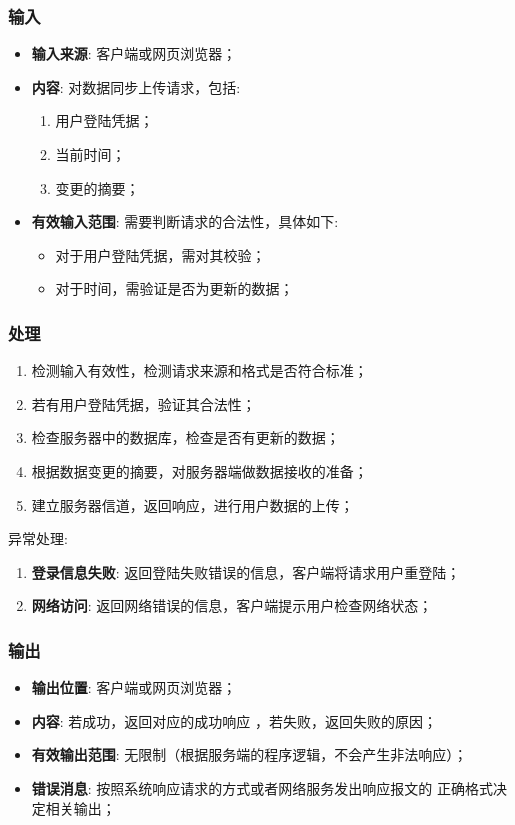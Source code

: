 \subsubsection{输入}
	\begin{itemize}
		\item \textbf{输入来源}: 客户端或网页浏览器；
		\item \textbf{内容}: 对数据同步上传请求，包括: 
		\begin{enumerate}
			\item 用户登陆凭据；
			\item 当前时间；
			\item 变更的摘要；
		\end{enumerate}
		\item \textbf{有效输入范围}: 需要判断请求的合法性，具体如下: 
		\begin{itemize}
			\item 对于用户登陆凭据，需对其校验； 
			\item 对于时间，需验证是否为更新的数据； 
		\end{itemize}
	\end{itemize}
\subsubsection{处理}
	\begin{enumerate}
		\item 检测输入有效性，检测请求来源和格式是否符合标准；
		\item 若有用户登陆凭据，验证其合法性；
		\item 检查服务器中的数据库，检查是否有更新的数据；
		\item 根据数据变更的摘要，对服务器端做数据接收的准备；
		\item 建立服务器信道，返回响应，进行用户数据的上传；
	\end{enumerate}
	\noindent 异常处理: 
	\begin{enumerate}
		\item \textbf{登录信息失败}: 返回登陆失败错误的信息，客户端将请求用户重登陆；
		\item \textbf{网络访问}: 返回网络错误的信息，客户端提示用户检查网络状态；
	\end{enumerate}
\subsubsection{输出}
\begin{itemize}
	\item \textbf{输出位置}: 客户端或网页浏览器；
	\item \textbf{内容}: 若成功，返回对应的成功响应 ，若失败，返回失败的原因；
	\item \textbf{有效输出范围}: 无限制（根据服务端的程序逻辑，不会产生非法响应）；
	\item \textbf{错误消息}: 按照系统响应请求的方式或者网络服务发出响应报文的
		正确格式决定相关输出；
\end{itemize}


